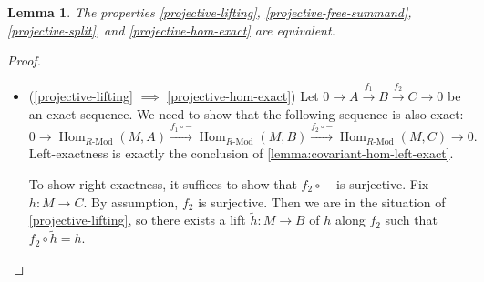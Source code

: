 \documentclass[11pt]{article}
\newcommand{\Hom}{\operatorname{Hom}}
\newcommand{\RHom}[3]{\Hom_{{#1}\text{-Mod}}({#2}, {#3})}
\newcommand{\wt}{\widetilde}
\theoremstyle{plain}
\newtheorem{lemma}{Lemma}[section]
\theoremstyle{definition}
\begin{document}
\begin{lemma}\label{lemma:projective-equivalent}
  The properties \ref{projective-lifting}, \ref{projective-free-summand}, \ref{projective-split}, and \ref{projective-hom-exact} are equivalent.
\end{lemma}
\begin{proof}
  \begin{itemize}
  \item (\ref{projective-lifting} \(\implies\) \ref{projective-hom-exact})
    Let \(0 \to A \overset{f_1}{\to} B \overset{f_2}{\to} C \to 0\) be an exact sequence. We need to show that the following sequence is also exact:
    \[0 \to \RHom{R}{M}{A} \overset{f_1 \circ -}{\to} \RHom{R}{M}{B} \overset{f_2 \circ -}{\to} \RHom{R}{M}{C} \to 0.\]
    Left-exactness is exactly the conclusion of \ref{lemma:covariant-hom-left-exact}.

    To show right-exactness, it suffices to show that \(f_2 \circ -\) is surjective. Fix \(h : M \to C\). By assumption, \(f_2\) is surjective. Then we are in the situation of \ref{projective-lifting}, so there exists a lift \(\wt{h} : M \to B\) of \(h\) along \(f_2\) such that \(f_2 \circ \wt{h} = h\).


\end{itemize}
\end{proof}
\end{document}
